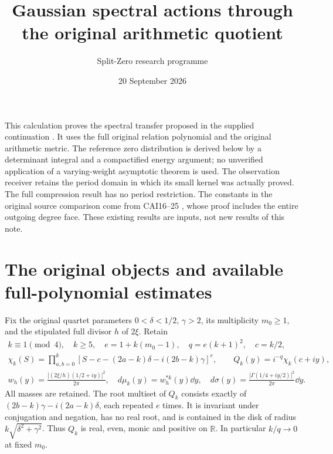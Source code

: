 \documentclass[11pt]{article}
\title{Gaussian spectral actions through the original arithmetic quotient}
\author{Split-Zero research programme}\date{20 September 2026}
\newcommand{\R}{\mathbb R}\newcommand{\C}{\mathbb C}
\begin{document}
\maketitle

This calculation proves the spectral transfer proposed in the supplied
continuation \cite{incoming}. It uses the full original relation polynomial
and the original arithmetic metric. The reference zero distribution is
derived below by a determinant integral and a compactified energy argument;
no unverified application of a varying-weight asymptotic theorem is used.
The observation receiver retains the period domain in which its small
kernel was actually proved. The full compression result has no period
restriction. The constants in the original source comparison come from
CAI16--25 \cite{cumulative}, whose proof includes the entire outgoing degree
face. These existing results are inputs, not new results of this note.

\section{The original objects and available full-polynomial estimates}
Fix the original quartet parameters $0<\delta<1/2$, $\gamma>2$, its
multiplicity $m_0\ge1$, and the stipulated full divisor $h$ of $2\xi$.
Retain
\begin{equation}\tag{NG1}
 \begin{gathered}
 k\equiv1\pmod4,\quad k\ge5,\quad e=1+k(m_0-1),\quad q=e(k+1)^2,\quad c=k/2,\\
 \chi_k(S)=\prod_{a,b=0}^k
 [S-c-(2a-k)\delta-i(2b-k)\gamma]^e,\qquad
 Q_k(y)=i^{-q}\chi_k(c+iy),\\
 w_h(y)=\frac{|(2\xi/h)(1/2+iy)|^2}{2\pi},\quad
 d\mu_k(y)=w_h^{*k}(y)\dd y,\quad
 d\sigma(y)=\frac{|\Gamma(1/4+iy/2)|^2}{2\pi}\dd y.
 \end{gathered}
\end{equation}
All masses are retained. The root multiset of $Q_k$ consists exactly of
$(2b-k)\gamma-i(2a-k)\delta$, each repeated $e$ times. It is invariant
under conjugation and negation, has no real root, and is contained in the
disk of radius $k\sqrt{\delta^2+\gamma^2}$. Thus $Q_k$ is real, even,
monic and positive on $\R$. In particular $k/q\to0$ at fixed $m_0$.
\end{document}
